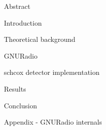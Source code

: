 




\usepackage{antropy_en}


  

  \newpage
  \tableofcontents

  \begin{topchapter}{Abstract}
    
  \end{topchapter}

  \begin{topchapter}{Introduction}
    
  \end{topchapter}

  \begin{topchapter}{Theoretical background}
    
  \end{topchapter}

  \begin{topchapter}{GNURadio}
    
  \end{topchapter}

  \begin{topchapter}{\acrlong{schcox} detector implementation}
    
  \end{topchapter}

  \begin{topchapter}{Results}
    
  \end{topchapter}

  \begin{topchapter}{Conclusion}
    
  \end{topchapter}

  \begin{topchapter}{Appendix - GNURadio internals}
    
  \end{topchapter}

  \newpage
  \printglossaries
  \printbibliography

  \vfill
  
  

